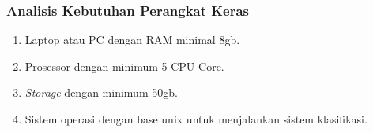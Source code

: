 \subsubsection{Analisis Kebutuhan Perangkat Keras}
\begin{enumerate}
    \item Laptop atau PC dengan RAM minimal 8gb.
    \item Prosessor dengan minimum 5 CPU Core.
    \item \textit{Storage} dengan minimum 50gb.
    \item Sistem operasi dengan base unix untuk menjalankan sistem klasifikasi.
\end{enumerate}